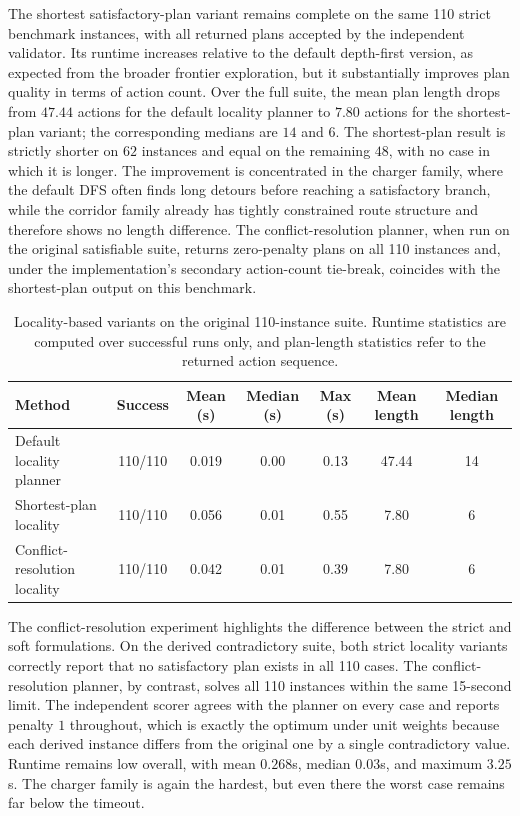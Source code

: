 \documentclass[a4paper,fleqn]{cas-dc}
\begin{document}
The shortest satisfactory-plan variant remains complete on the same 110 strict benchmark instances, with all returned plans accepted by the independent validator. Its runtime increases relative to the default depth-first version, as expected from the broader frontier exploration, but it substantially improves plan quality in terms of action count. Over the full suite, the mean plan length drops from $47.44$ actions for the default locality planner to $7.80$ actions for the shortest-plan variant; the corresponding medians are $14$ and $6$. The shortest-plan result is strictly shorter on $62$ instances and equal on the remaining $48$, with no case in which it is longer. The improvement is concentrated in the charger family, where the default DFS often finds long detours before reaching a satisfactory branch, while the corridor family already has tightly constrained route structure and therefore shows no length difference. The conflict-resolution planner, when run on the original satisfiable suite, returns zero-penalty plans on all 110 instances and, under the implementation's secondary action-count tie-break, coincides with the shortest-plan output on this benchmark.

\begin{table}[ht!]
\centering
\caption{Locality-based variants on the original 110-instance suite. Runtime statistics are computed over successful runs only, and plan-length statistics refer to the returned action sequence.}
\label{t:eval-variants}
\begin{tabular}{lcccccc}
\toprule
Method & Success & Mean (s) & Median (s) & Max (s) & Mean length & Median length \\
\midrule
Default locality planner & 110/110 & 0.019 & 0.00 & 0.13 & 47.44 & 14 \\
Shortest-plan locality & 110/110 & 0.056 & 0.01 & 0.55 & 7.80 & 6 \\
Conflict-resolution locality & 110/110 & 0.042 & 0.01 & 0.39 & 7.80 & 6 \\
\bottomrule
\end{tabular}
\end{table}

The conflict-resolution experiment highlights the difference between the strict and soft formulations. On the derived contradictory suite, both strict locality variants correctly report that no satisfactory plan exists in all 110 cases. The conflict-resolution planner, by contrast, solves all 110 instances within the same 15-second limit. The independent scorer agrees with the planner on every case and reports penalty $1$ throughout, which is exactly the optimum under unit weights because each derived instance differs from the original one by a single contradictory value. Runtime remains low overall, with mean $0.268$s, median $0.03$s, and maximum $3.25$s. The charger family is again the hardest, but even there the worst case remains far below the timeout.
\end{document}
